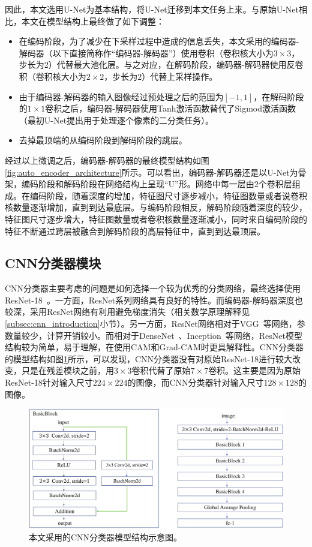 因此，本文选用U-Net为基本结构，将U-Net迁移到本文任务上来。与原始U-Net相比，本文在模型结构上最终做了如下调整：
\begin{itemize}
	\item 在编码阶段，为了减少在下采样过程中造成的信息丢失，本文采用的编码器-解码器（以下直接简称作“编码器-解码器”）使用卷积（卷积核大小为$3\times 3$，步长为2）代替最大池化层。与之对应，在解码阶段，编码器-解码器使用反卷积（卷积核大小为$2\times 2$，步长为2）代替上采样操作。
	\item 由于编码器-解码器的输入图像经过预处理之后的范围为$[-1,1]$，在解码阶段的$1\times 1$卷积之后，编码器-解码器使用Tanh激活函数替代了Sigmod激活函数（最初U-Net提出用于处理逐个像素的二分类任务）。
	\item 去掉最顶端的从编码阶段到解码阶段的跳层。
\end{itemize}
经过以上微调之后，编码器-解码器的最终模型结构如图\ref{fig:auto_encoder_architecture}所示。可以看出，编码器-解码器还是以U-Net为骨架，编码阶段和解码阶段在网络结构上呈现“U”形。网络中每一层由2个卷积层组成。在编码阶段，随着深度的增加，特征图尺寸逐步减小，特征图数量或者说卷积核数量逐渐增加，直到到达最底层。与编码阶段相反，解码阶段随着深度的较少，特征图尺寸逐步增大，特征图数量或者卷积核数量逐渐减小，同时来自编码阶段的特征不断通过跨层被融合到解码阶段的高层特征中，直到到达最顶层。
\subsection{CNN分类器模块}\label{subsec:cnn_classifier_model}
CNN分类器主要考虑的问题是如何选择一个较为优秀的分类网络，最终选择使用ResNet-18~\cite{he2016deep}。一方面，ResNet系列网络具有良好的特性。而编码器-解码器深度也较深，采用ResNet网络有利用避免梯度消失（相关数学原理解释见\ref{subsec:cnn_introduction}小节）。另一方面，ResNet网络相对于VGG~\cite{simonyan2014very}等网络，参数量较少，计算开销较小。而相对于DenseNet~\cite{huang2017densely}、Inception~\cite{szegedy2016rethinking, szegedy2017inception}等网络，ResNet模型结构较为简单，易于理解，在使用CAM和Grad-CAM时更具解释性。CNN分类器的模型结构如图\ref{fig:classifier_architecture}所示，可以发现，CNN分类器没有对原始ResNet-18进行较大改变，只是在残差模块之前，用$3\times 3$卷积代替了原始$7\times 7$卷积。这主要是因为原始ResNet-18针对输入尺寸$224\times 224$的图像，而CNN分类器针对输入尺寸$128\times 128$的图像。
\begin{figure}[h]
	\centering
	\includegraphics[width=1.0\textwidth]{figure/classifier_architecture.png}
	\caption{本文采用的CNN分类器模型结构示意图。}
	\label{fig:classifier_architecture}
\end{figure}
